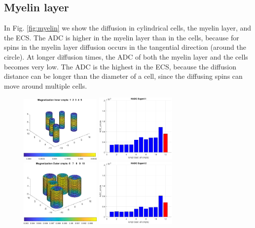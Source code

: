 \documentclass[a4paper]{article}
\begin{document}
\subsection{Myelin layer}

In Fig. \ref{fig:myelin} we show the diffusion in cylindrical cells, the myelin layer, and the ECS. The ADC is higher in the myelin layer than in the cells, because for spins in the myelin layer diffusion occurs in the tangential direction (around the circle). At longer diffusion times, the ADC of both the myelin layer and the cells becomes very low. The ADC is the highest in the ECS, because the diffusion distance can be longer than the diameter of a cell, since the diffusing spins can move around multiple cells.

\begin{figure}
    \centering
    \includegraphics[width=0.35\textwidth]{plot_magnetization/5cyl_cells_myelin.png}\quad
    \includegraphics[width=0.35\textwidth]{plot_adc/hadc_5cyl1.pdf}\\
    \vspace{0.2cm}
    \includegraphics[width=0.35\textwidth]{plot_magnetization/5cyl_myelin_myelin.png} \quad
    \includegraphics[width=0.35\textwidth]{plot_adc/hadc_5cyl2.pdf}\\

\end{figure}
\end{document}
